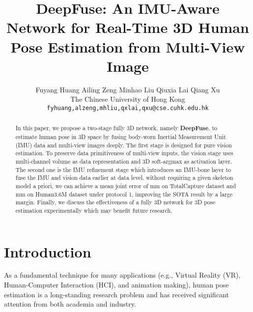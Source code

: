 \documentclass[10pt,twocolumn,letterpaper]{article}
\begin{document}
\title{DeepFuse: An IMU-Aware Network for Real-Time 3D Human Pose Estimation from Multi-View Image}

\author{Fuyang Huang \hspace{1cm} Ailing Zeng \hspace{1cm} Minhao Liu \hspace{1cm} Qiuxia Lai \hspace{1cm} Qiang Xu\\
The Chinese University of Hong Kong\\
{\tt\small fyhuang,alzeng,mhliu,qxlai,qxu@cse.cuhk.edu.hk}
}





\maketitle
\ifwacvfinal\thispagestyle{empty}\fi

\begin{abstract}


In this paper, we propose a two-stage fully 3D network, namely \textbf{DeepFuse}, to estimate human pose in 3D space by fusing body-worn Inertial Measurement Unit (IMU) data and multi-view images deeply. The first stage is designed for pure vision estimation. To preserve data primitiveness of multi-view inputs, the vision stage uses multi-channel volume as data representation and 3D soft-argmax as activation layer. The second one is the IMU refinement stage which introduces an IMU-bone layer to fuse the IMU and vision data earlier at data level. without requiring a given skeleton model a priori, we can achieve a mean joint error of mm on TotalCapture dataset and mm on Human3.6M dataset under protocol 1, improving the SOTA result by a large margin. Finally, we discuss the effectiveness of a fully 3D network for 3D pose estimation experimentally which may benefit future research.

\end{abstract}

\vspace{-0.5cm}
\section{Introduction}
As a fundamental technique for many applications (e.g., Virtual Reality (VR), Human-Computer Interaction (HCI), and animation making), human pose estimation is a long-standing research problem and has received significant attention from both academia and industry. 
\end{document}
